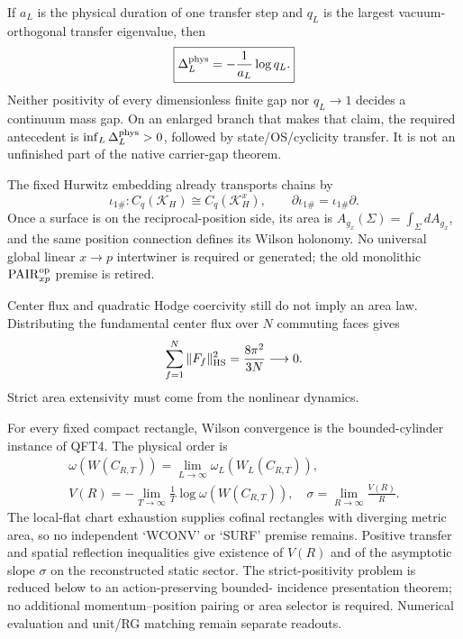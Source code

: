 \documentclass[12pt,a4paper]{article}
\begin{document}
\begin{theorem}
\label{p10:thm:v164-physical-transfer-gap}
If \(a_L\) is the physical duration of one transfer step and \(q_L\) is the
largest vacuum-orthogonal transfer eigenvalue, then
\[
 \boxed{\Delta_L^{\rm phys}=-\frac1{a_L}\log q_L.}
\]
Neither positivity of every dimensionless finite gap nor \(q_L\to1\)
decides a continuum mass gap.  On an enlarged branch that makes that claim,
the required antecedent is \(\inf_L\Delta_L^{\rm phys}>0\), followed by
state/OS/cyclicity transfer.  It is not an unfinished part of the native
carrier-gap theorem.
\end{theorem}

\begin{theorem}
\label{p10:thm:v164-position-area-factorization}
The fixed Hurwitz embedding already transports chains by
\[
 \iota_{1\#}:C_q(\mathcal K_H)\cong C_q(\mathcal K_H^x),
 \qquad \partial\iota_{1\#}=\iota_{1\#}\partial.
\]
Once a surface is on the reciprocal-position side, its area is
\(A_{g_x}(\Sigma)=\int_\Sigma dA_{g_x}\), and the same position connection
defines its Wilson holonomy.  No universal global linear \(x\to p\)
intertwiner is required or generated; the old monolithic
\(\mathrm{PAIR}_{xp}^{\rm op}\) premise is retired.

Center flux and quadratic Hodge coercivity still do not imply an area law.
Distributing the fundamental center flux over \(N\) commuting faces gives
\[
 \sum_{f=1}^N\|F_f\|_{\rm HS}^2=\frac{8\pi^2}{3N}\longrightarrow0.
\]
Strict area extensivity must come from the nonlinear dynamics.
\end{theorem}

\begin{theorem}
\label{p10:thm:v164-ordered-wilson-limits}
For every fixed compact rectangle, Wilson convergence is the bounded-cylinder
instance of QFT4.  The physical order is
\[
\begin{gathered}
 \omega(W(C_{R,T}))=\lim_{L\to\infty}\omega_L(W_L(C_{R,T})),\\
 V(R)=-\lim_{T\to\infty}\frac1T\log\omega(W(C_{R,T})),\quad
 \sigma=\lim_{R\to\infty}\frac{V(R)}R.
\end{gathered}
\]
The local-flat chart exhaustion supplies cofinal rectangles with diverging
metric area, so no independent `WCONV' or `SURF' premise remains.  Positive
transfer and spatial reflection inequalities give existence of \(V(R)\) and
of the asymptotic slope \(\sigma\) on the reconstructed static sector.  The
strict-positivity problem is reduced below to an action-preserving bounded-
incidence presentation theorem; no additional momentum--position pairing or
area selector is required.  Numerical evaluation and unit/RG matching remain
separate readouts.
\end{theorem}
\end{document}
